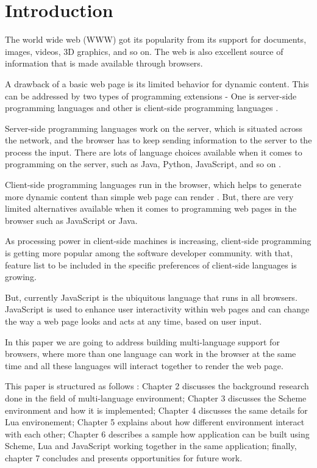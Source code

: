 \chapter{Introduction}
The world wide web (WWW) got its popularity from its support for documents, images, videos, 3D graphics, and so on. The web is also excellent source of information that is made available through browsers.

A drawback of a basic web page is its limited behavior for dynamic content. This can be addressed by two types of programming extensions -  One is server-side programming languages and other is client-side programming languages \cite{LoginWeb}.

Server-side programming languages work on the server, which is situated across the network, and the browser has to keep sending information to the server to the process the input. There are lots of language choices available when it comes to programming on the server, such as Java, Python, JavaScript, and so on \cite{LoginWeb}. 

Client-side programming languages run in the browser, which helps to generate more dynamic content than simple web page can render \cite{Hickey:2004:SWP:1028174.971423}. But, there are very limited alternatives available when it comes to programming web pages in the browser such as JavaScript or Java.

As processing power in client-side machines is increasing, client-side programming is getting more popular among the software developer community. with that, feature list to be included in the specific preferences of client-side languages is growing. 

But, currently JavaScript is the ubiquitous language that runs in all browsers. JavaScript is used to enhance user interactivity within web pages and can change the way a web page looks and acts at any time, based on user input.

In this paper we are going to address building multi-language support for browsers, where more than one language can work in the browser at the same time and all these languages will interact together to render the web page. 


This paper is structured as follows :
Chapter 2 discusses the background research done in the field of multi-language environment; Chapter 3 discusses the Scheme environment and how it is implemented; Chapter 4 discusses the same details for Lua environement; Chapter 5 explains about how different environment interact with each other; Chapter 6 describes a sample how application can be built using Scheme, Lua and JavaScript working together in the same application; finally, chapter 7 concludes and presents opportunities for future work.

